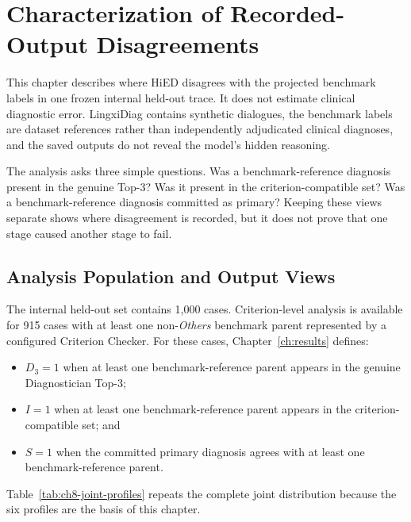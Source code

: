 \chapter{Characterization of Recorded-Output Disagreements}
\label{ch:error}

This chapter describes where HiED disagrees with the projected benchmark labels in one frozen internal held-out trace. It does not estimate clinical diagnostic error. LingxiDiag contains synthetic dialogues, the benchmark labels are dataset references rather than independently adjudicated clinical diagnoses, and the saved outputs do not reveal the model's hidden reasoning.

The analysis asks three simple questions. Was a benchmark-reference diagnosis present in the genuine Top-3? Was it present in the criterion-compatible set? Was a benchmark-reference diagnosis committed as primary? Keeping these views separate shows where disagreement is recorded, but it does not prove that one stage caused another stage to fail.

\section{Analysis Population and Output Views}
\label{sec:ch8-stagewise-taxonomy}

The internal held-out set contains 1,000 cases. Criterion-level analysis is available for 915 cases with at least one non-\emph{Others} benchmark parent represented by a configured Criterion Checker. For these cases, Chapter~\ref{ch:results} defines:

\begin{itemize}
    \item $D_3=1$ when at least one benchmark-reference parent appears in the genuine Diagnostician Top-3;
    \item $I=1$ when at least one benchmark-reference parent appears in the criterion-compatible set; and
    \item $S=1$ when the committed primary diagnosis agrees with at least one benchmark-reference parent.
\end{itemize}

Table~\ref{tab:ch8-joint-profiles} repeats the complete joint distribution because the six profiles are the basis of this chapter.

